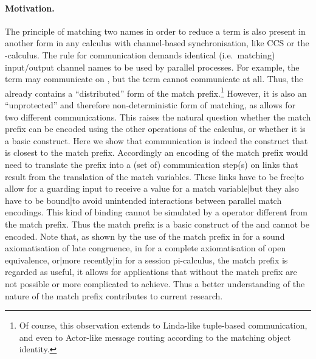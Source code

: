 \documentclass[final,copyright,creativecommons]{eptcs}
\begin{document}
\paragraph{Motivation.} The principle of matching two names in order to reduce a term is also present in another form in any calculus with channel-based synchronisation, like CCS or the -calculus.
The rule for communication demands identical (i.e.~matching) input/output channel names to be used by parallel processes. For example, the term  may communicate on , but the term  cannot communicate at all. Thus, the \piCal already contains a ``distributed'' form of the match prefix.\footnote{Of course, this observation extends to Linda-like tuple-based communication, and even to Actor-like message routing according to the matching object identity.} However, it is also an ``unprotected'' and therefore non-deterministic form of matching, as  allows for two different communications. This raises the natural question whether the match prefix can be encoded using the other operations of the calculus, or whether it is a basic construct.
Here we show that communication is indeed the \piCal construct that is closest to the match prefix.
Accordingly an encoding of the match prefix would need to translate the prefix into a (set of) communication step(s) on links that result from the translation of the match variables. These links have to be free|to allow for a guarding input to receive a value for a match variable|but they also have to be bound|to avoid unintended interactions between parallel match encodings. This kind of binding cannot be simulated by a \piCal operator different from the match prefix.
Thus the match prefix is a basic construct of the \piCal and cannot be encoded.
Note that, as shown by the use of the match prefix \eg in \cite{milnerParrowWalker92} for a sound axiomatisation of late congruence, in \cite{sangiorgi96} for a complete axiomatisation of open equivalence, {or}|{more recently}|{in} \cite{giunti13} for a session pi-calculus, the match prefix is regarded as useful, \ie it allows for applications that without the match prefix are not possible or more complicated to achieve.
Thus a better understanding of the nature of the match prefix contributes to current research.
\end{document}
